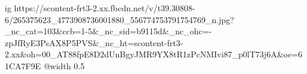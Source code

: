  
 
 
 
 

\ifcmt
  ig https://scontent-frt3-2.xx.fbcdn.net/v/t39.30808-6/265375623_4773908736001880_556774753791754769_n.jpg?_nc_cat=103&ccb=1-5&_nc_sid=b9115d&_nc_ohc=-zpJfRyE3PsAX8P5PVS&_nc_ht=scontent-frt3-2.xx&oh=00_AT88fpE8D2dUnBgyJMR9YX8tR1zPcNMIvi87_p0lT73j6A&oe=61CA7F9E
  @width 0.5
\fi
